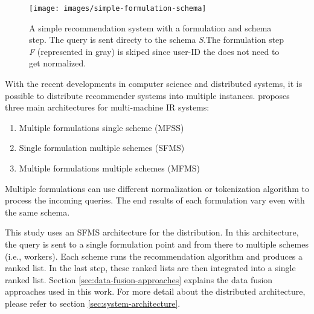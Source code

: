 \begin{figure}[!ht]
    \centering
    \texttt{[image: images/simple-formulation-schema]}
    \caption{A simple recommendation system with a formulation and schema step. The query is sent directy to the schema \emph{S}.The formulation step \emph{F} (represented in gray) is skiped since user-ID the does not need to get normalized.}
    \label{fig:data-fusion-simple}
\end{figure}


With the recent developments in computer science and distributed systems, it is possible to distribute recommender systems into multiple instances. \cite{frankhsuComparingRankScore2005} proposes three main architectures for multi-machine IR systems:

\begin{enumerate}
    \item Multiple formulations single scheme (MFSS)
    \item Single formulation multiple schemes (SFMS)
    \item Multiple formulations multiple schemes (MFMS)
\end{enumerate}


Multiple formulations can use different normalization or tokenization algorithm to process the incoming queries. The end results of each formulation vary even with the same schema.


This study uses an SFMS architecture for the distribution. In this architecture, the query is sent to a single formulation point and from there to multiple schemes (i.e., workers). Each scheme runs the recommendation algorithm and produces a ranked list. In the last step, these ranked lists are then integrated into a single ranked list. Section \ref{sec:data-fusion-approaches} explains the data fusion approaches used in this work. For more detail about the distributed architecture, please refer to section \ref{sec:system-architecture}.


